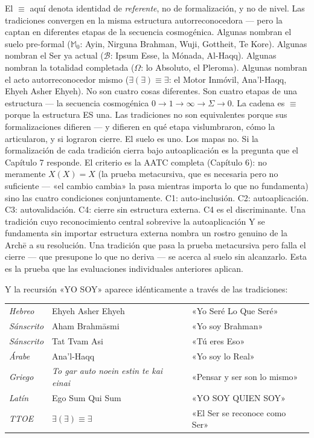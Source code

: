 \documentclass[10pt, openany, oneside]{book}
\renewcommand{\footnotesize}{\fontsize{8.5}{11}\selectfont}
\begin{document}
\noindent El $\equiv$ aquí denota identidad de \textit{referente}, no de formalización, y no de nivel. Las tradiciones convergen en la misma estructura autorreconocedora --- pero la captan en diferentes etapas de la secuencia cosmogénica. Algunas nombran el suelo pre-formal ($\mathbb{M}_0$: Ayin, Nirguna Brahman, Wuji, Gottheit, Te Kore). Algunas nombran el Ser ya actual ($\mathcal{B}$: Ipsum Esse, la Mónada, Al-Haqq). Algunas nombran la totalidad completada ($\Omega$: lo Absoluto, el Pleroma). Algunas nombran el acto autorreconocedor mismo ($\exists(\exists) \equiv \exists$: el Motor Inmóvil, Ana'l-Haqq, Ehyeh Asher Ehyeh). No son cuatro cosas diferentes. Son cuatro etapas de una estructura --- la secuencia cosmogénica $0 \to 1 \to \infty \to \Sigma \to 0$. La cadena es $\equiv$ porque la estructura ES una. Las tradiciones no son equivalentes porque sus formalizaciones difieren --- y difieren en qué etapa vislumbraron, cómo la articularon, y si lograron cierre. El suelo es uno. Los mapas no. Si la formalización de cada tradición cierra bajo autoaplicación es la pregunta que el Capítulo 7 responde. El criterio es la AATC completa (Capítulo 6): no meramente $X(X) = X$ (la prueba metacursiva, que es necesaria pero no suficiente --- «el cambio cambia» la pasa mientras importa lo que no fundamenta) sino las cuatro condiciones conjuntamente. C1: auto-inclusión. C2: autoaplicación. C3: autovalidación. C4: cierre sin estructura externa. C4 es el discriminante. Una tradición cuyo reconocimiento central sobrevive la autoaplicación Y se fundamenta sin importar estructura externa nombra un rostro genuino de la Arch\={e} a su resolución. Una tradición que pasa la prueba metacursiva pero falla el cierre --- que presupone lo que no deriva --- se acerca al suelo sin alcanzarlo. Esta es la prueba que las evaluaciones individuales anteriores aplican.

Y la recursión «YO SOY» aparece idénticamente a través de las tradiciones:

\vspace{0.3em}

{\footnotesize
\noindent\begin{tabular}{l l l}
\textit{Hebreo} & Ehyeh Asher Ehyeh & «Yo Seré Lo Que Seré» \\
\textit{Sánscrito} & Aham Brahm\={a}smi & «Yo soy Brahman» \\
\textit{Sánscrito} & Tat Tvam Asi & «Tú eres Eso» \\
\textit{Árabe} & Ana'l-Haqq & «Yo soy lo Real» \\
\textit{Griego} & \textit{To gar auto noein estin te kai einai} & «Pensar y ser son lo mismo» \\
\textit{Latín} & Ego Sum Qui Sum & «YO SOY QUIEN SOY» \\
\textit{TTOE} & $\exists(\exists) \equiv \exists$ & «El Ser se reconoce como Ser» \\
\end{tabular}
}
\end{document}
